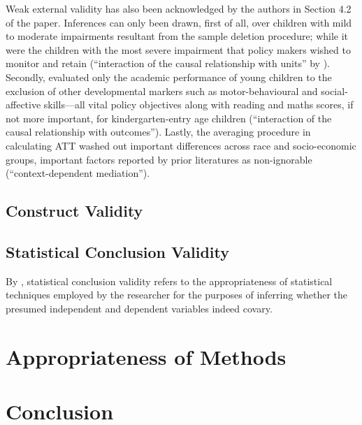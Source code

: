 Weak external validity has also been acknowledged by the authors in Section 4.2 of the paper. Inferences can only been drawn, first of all, over children with mild to moderate impairments resultant from the sample deletion procedure; while it were the children with the most severe impairment that policy makers wished to monitor and retain (``interaction of the causal relationship with units'' by \textcite{shadish:2002}). Secondly, \textcite{sullivan:2013} evaluated only the academic performance of young children to the exclusion of other developmental markers such as motor-behavioural and social-affective skills---all vital policy objectives along with reading and maths scores, if not more important, for kindergarten-entry age children (``interaction of the causal relationship with outcomes''). Lastly, the averaging procedure in calculating ATT washed out important differences across race and socio-economic groups, important factors reported by prior literatures as non-ignorable (``context-dependent mediation'').

\subsection{Construct Validity}

\subsection{Statistical Conclusion Validity}

By \textcite{cook:1979}, statistical conclusion validity refers to the appropriateness of statistical techniques employed by the researcher for the purposes of inferring whether the presumed independent and dependent variables indeed covary.

\section{Appropriateness of Methods}

\section{Conclusion}
